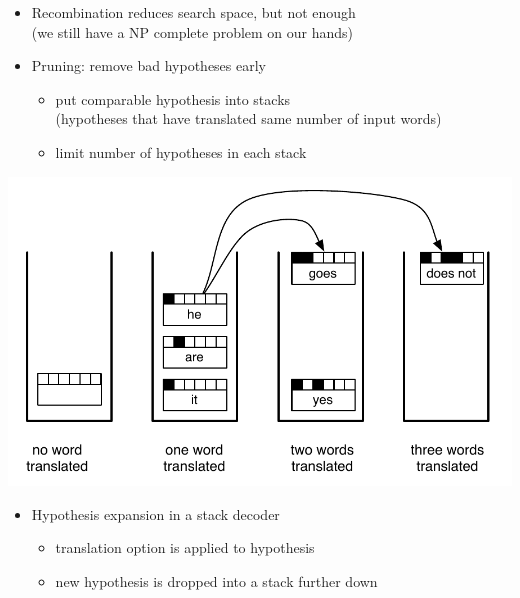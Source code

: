 \documentclass[landscape]{slides}
\begin{document}

\begin{itemize} \vspace{25mm}
\item Recombination reduces search space, but not enough\\[3mm]
(we still have a NP complete problem on our hands)
\item Pruning: remove bad hypotheses early
\begin{itemize}
\item put comparable hypothesis into stacks\\
(hypotheses that have translated same number of input words)
\item limit number of hypotheses in each stack
\end{itemize}
\end{itemize}


\begin{center}
\includegraphics[scale=1.2]{hypothesis-stacks-fw.pdf}
\end{center} \vspace{-9mm}
\begin{itemize}
\item Hypothesis expansion in a stack decoder \vspace{-3mm}
\begin{itemize}
\item translation option is applied to hypothesis
\item new hypothesis is dropped into a stack further down
\end{itemize}
\end{itemize}
\end{document}
